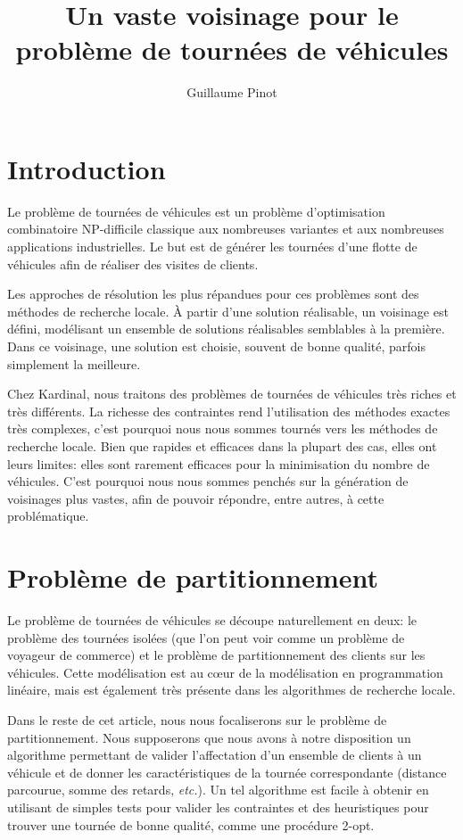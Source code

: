 \documentclass{roadef}
\title{Un vaste voisinage pour le problème de tournées de véhicules}
\author{Guillaume Pinot}
\institute{
  Kardinal, Paris, France\\
  \email{guillaume.pinot@kardinal.ai}
}
\begin{document}
\maketitle


\section{Introduction}

Le problème de tournées de véhicules est un problème d'optimisation
combinatoire NP-difficile classique aux nombreuses variantes et aux
nombreuses applications industrielles. Le but est de générer les
tournées d'une flotte de véhicules afin de réaliser des visites de
clients.

Les approches de résolution les plus répandues pour ces problèmes sont
des méthodes de recherche locale. À partir d'une solution réalisable,
un voisinage est défini, modélisant un ensemble de solutions
réalisables semblables à la première. Dans ce voisinage, une solution
est choisie, souvent de bonne qualité, parfois simplement la
meilleure.

Chez Kardinal, nous traitons des problèmes de tournées de véhicules
très riches et très différents. La richesse des contraintes rend
l'utilisation des méthodes exactes très complexes, c'est pourquoi nous
nous sommes tournés vers les méthodes de recherche locale. Bien que
rapides et efficaces dans la plupart des cas, elles ont leurs limites:
elles sont rarement efficaces pour la minimisation du nombre de
véhicules. C'est pourquoi nous nous sommes penchés sur la génération
de voisinages plus vastes, afin de pouvoir répondre, entre autres, à
cette problématique.

\section{Problème de partitionnement}

Le problème de tournées de véhicules se découpe naturellement en deux:
le problème des tournées isolées (que l'on peut voir comme un problème
de voyageur de commerce) et le problème de partitionnement des clients
sur les véhicules. Cette modélisation est au cœur de la modélisation
en programmation linéaire, mais est également très présente dans les
algorithmes de recherche locale.

Dans le reste de cet article, nous nous focaliserons sur le problème
de partitionnement. Nous supposerons que nous avons à notre
disposition un algorithme permettant de valider l'affectation d'un
ensemble de clients à un véhicule et de donner les caractéristiques
de la tournée correspondante (distance parcourue, somme des retards,
\emph{etc.}). Un tel algorithme est facile à obtenir en utilisant de
simples tests pour valider les contraintes et des heuristiques pour
trouver une tournée de bonne qualité, comme une procédure 2-opt.
\end{document}
